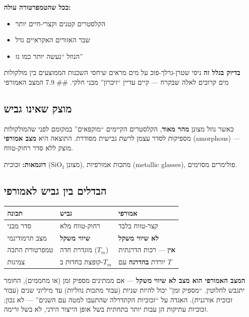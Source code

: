 \documentclass[
  hebrew,
  letterpaper,
  DIV=11,
  numbers=noendperiod]{scrreprt}
\newcounter{none} %
\providecommand{\tightlist}{%
  \setlength{\itemsep}{0pt}\setlength{\parskip}{0pt}}
\begin{document}
\textbf{ככל שהטמפרטורה עולה:}

\begin{itemize}
\tightlist
\item
  הקלסטרים קטנים וקצרי-חיים יותר
\item
  שבר האזורים האקראיים גדל
\item
  הנוזל ``נעשה יותר כמו גז''
\end{itemize}

\textbf{בדיוק בגלל זה} ניסי שטרן-גרלך-פוכ על מים מראים שיחסי השכנות
הממוצעים בין מולקולות מים קרובים לאלה שבקרח --- קיים עדיין ``זיכרון''
מבני חלקי. \#\# 7.9 המצב האמורפי

\subsection{מוצק שאינו
גביש}\label{ux5deux5d5ux5e6ux5e7-ux5e9ux5d0ux5d9ux5e0ux5d5-ux5d2ux5d1ux5d9ux5e9}

כאשר נוזל מצונן \textbf{מהר מאוד}, הקלסטרים הקיימים ``מוקפאים'' במקומם
לפני שהמולקולות מספיקות לסדר עצמן לרשת גבישית מסודרת. התוצאה היא
\textbf{מצב אמורפי} (amorphous) --- מוצק ללא סדר רחוק-טווח.

\textbf{דוגמאות:} זכוכית (SiO₂ מצונן), מתכות אמורפיות (metallic
glasses), פולימרים מסוימים.

\subsection{הבדלים בין גביש
לאמורפי}\label{ux5d4ux5d1ux5d3ux5dcux5d9ux5dd-ux5d1ux5d9ux5df-ux5d2ux5d1ux5d9ux5e9-ux5dcux5d0ux5deux5d5ux5e8ux5e4ux5d9}

{\def\LTcaptype{none} %
\begin{longtable}[]{@{}lll@{}}
\toprule\noalign{}
תכונה & גביש & אמורפי \\
\midrule\noalign{}
\endhead
\bottomrule\noalign{}
\endlastfoot
סדר מבני & רחוק-טווח מלא & קצר-טווח בלבד \\
מצב תרמודינמי & \textbf{שיווי משקל} & \textbf{לא שיווי משקל} \\
טמפרטורת התכה & מוגדרת חדה (\(T_m\)) & \textbf{אין} --- רכות הדרגתית \\
צמיגות & קופצת בחדות ב-\(T_m\) & יורדת \textbf{בהדרגה} עם \(T\) \\
\end{longtable}
}

\textbf{המצב האמורפי הוא מצב לא שיווי משקל} --- אם ממתינים מספיק זמן (או
מחממים), החומר יתגבש לחלוטין. ``מספיק זמן'' יכול להיות שניות (עבור מתכות
נוזליות) עד מיליוני שנים (עבור זכוכית אורגנית). האגדה על ``זכוכיות
הקתדרלה שהתעבו למטה עם השנים'' --- לא נכון; זכוכיות עתיקות הן עבות יותר
בתחתית בשל אופן הייצור הידני, לא בשל זרימה.
\end{document}
